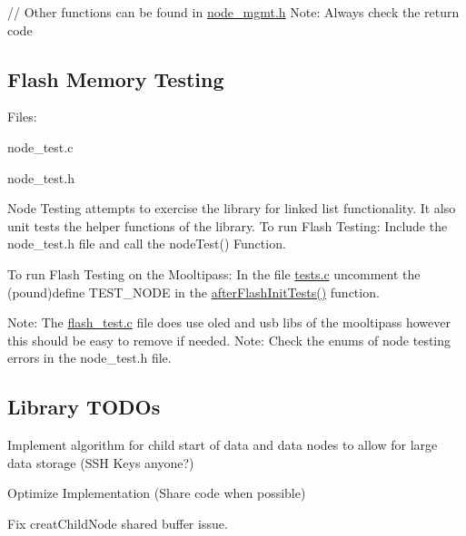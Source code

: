 // Other functions can be found in \hyperlink{node__mgmt_8h}{node\+\_\+mgmt.\+h} Note\+: Always check the return code

\subsection*{Flash Memory Testing}

Files\+:
\begin{DoxyItemize}
\item node\+\_\+test.\+c
\item node\+\_\+test.\+h
\end{DoxyItemize}

Node Testing attempts to exercise the library for linked list functionality. It also unit tests the helper functions of the library. To run Flash Testing\+: Include the node\+\_\+test.\+h file and call the node\+Test() Function.

To run Flash Testing on the Mooltipass\+: In the file \hyperlink{tests_8c}{tests.\+c} uncomment the (pound)define T\+E\+S\+T\+\_\+\+N\+O\+DE in the \hyperlink{tests_8c_addcf4f96c53f7eb5ceaca415681abf65}{after\+Flash\+Init\+Tests()} function.

Note\+: The \hyperlink{flash__test_8c}{flash\+\_\+test.\+c} file does use oled and usb libs of the mooltipass however this should be easy to remove if needed. Note\+: Check the enums of node testing errors in the node\+\_\+test.\+h file.

\subsection*{Library T\+O\+DO\textquotesingle{}s}


\begin{DoxyItemize}
\item Implement algorithm for child start of data and data nodes to allow for \textquotesingle{}large\textquotesingle{} data storage (S\+SH Keys anyone?)
\item Optimize Implementation (Share code when possible)
\item Fix creat\+Child\+Node shared buffer issue. 
\end{DoxyItemize}